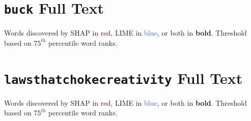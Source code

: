 \documentclass[10pt,letterpaper]{article}
\begin{document}
\newpage

\section{\texttt{buck} Full Text} \label{sec:buck_text}

Words discovered by SHAP in \textcolor{Maroon}{red}, LIME in \textcolor{RoyalBlue}{blue}, or both in \textbf{bold}. Threshold based on $75^{th}$ percentile word ranks.

\vspace{1em}
\noindent
\begin{minipage}{\textwidth}
\scriptsize %
\begin{spacing}{1.0} %

\end{spacing}
\end{minipage}
\vspace{1em}

\newpage

\section{\texttt{lawsthatchokecreativity} Full Text} \label{sec:laws_text}

Words discovered by SHAP in \textcolor{Maroon}{red}, LIME in \textcolor{RoyalBlue}{blue}, or both in \textbf{bold}. Threshold based on $75^{th}$ percentile word ranks.

\vspace{1em}
\noindent
\begin{minipage}{\textwidth}
\ssmall %
\begin{spacing}{1.0} %

\end{spacing}
\end{minipage}
\vspace{1em}
\end{document}
